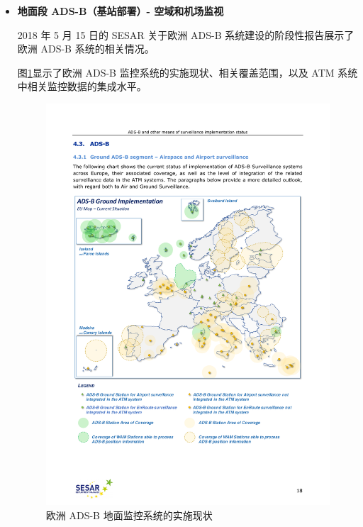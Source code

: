 \begin{itemize}

    \item \textbf{地面段 ADS-B（基站部署）- 空域和机场监视}

    2018 年 5 月 15 日的 SESAR 关于欧洲 ADS-B 系统建设的阶段性报告展示了欧洲 ADS-B 系统的相关情况。

    图\ref{fig:20180515-sesar-ads-b-report_18}显示了欧洲 ADS-B 监控系统的实施现状、相关覆盖范围，以及 ATM 系统中相关监控数据的集成水平。

    \begin{figure}[htbp]
    \centering
    \includegraphics[width=14cm]{pic/20180515-sesar-ads-b-report_18.pdf}
    \caption{欧洲 ADS-B 地面监控系统的实施现状\protect\footnotemark}
    \label{fig:20180515-sesar-ads-b-report_18}
    \end{figure}


\end{itemize}
